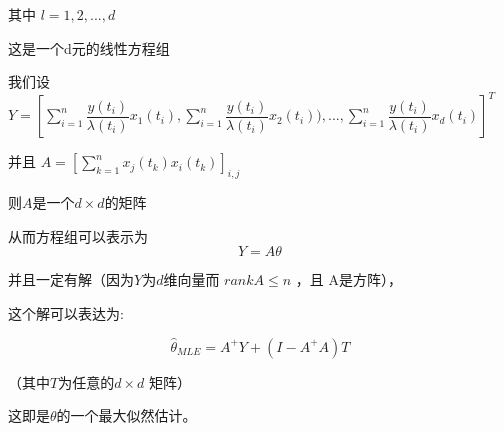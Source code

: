 \documentclass[12pt, a4paper]{ctexart}
\begin{document}
\begin{flushleft}
    其中 $l=1,2,...,d$

    这是一个d元的线性方程组

    我们设$Y=[\sum_{i=1}^n \dfrac{y(t_i)}{\lambda(t_i)} x_1(t_i),\sum_{i=1}^n \dfrac{y(t_i)}{\lambda(t_i)} x_2(t_i)),...,\sum_{i=1}^n \dfrac{y(t_i)}{\lambda(t_i)} x_d(t_i)]^T$

    并且 $A= [\sum_{k=1}^nx_j(t_k)x_i(t_k)]_{i,j}$

    则$A$是一个$d\times d$的矩阵

    从而方程组可以表示为\[
        Y = A\theta
    \]

    并且一定有解（因为$Y$为$d$维向量而 $rank A \leq n$ ，且 A是方阵），

    这个解可以表达为:

    \[
        \hat{\theta}_{MLE}= A^+Y+(I-A^+A)T
    \]

    （其中$T$为任意的$d\times d$ 矩阵）

    这即是$\theta$的一个最大似然估计。


\end{flushleft}
\end{document}
